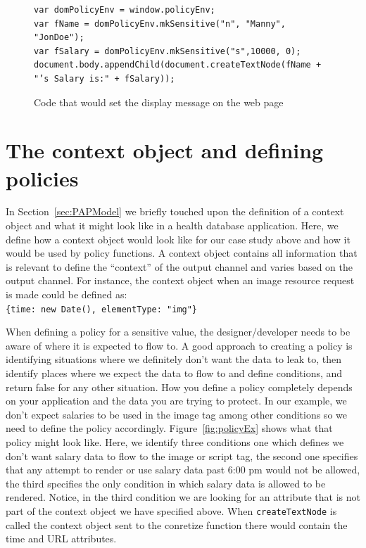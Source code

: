 \begin{figure}
  \begin{lstlisting}
var domPolicyEnv = window.policyEnv;
var fName = domPolicyEnv.mkSensitive("n", "Manny", "JonDoe");
var fSalary = domPolicyEnv.mkSensitive("s",10000, 0);
document.body.appendChild(document.createTextNode(fName + "’s Salary is:" + fSalary));
  \end{lstlisting}
  \caption{Code that would set the display message on the web page}
  \label{fig:displaySalary}
\end{figure}

\section{The context object and defining policies \label{sec:ctxt}}
In Section~\ref{sec:PAPModel} we briefly touched upon the definition of a context
object and what it might look like in a health database application. Here, we define
how a context object would look like for our case study above and how it would be used
by policy functions. A context object contains all information that is relevant
to define the ``context'' of the output channel and varies based on the output
channel. For instance, the context object when an image resource request is made
could be defined as:\\
\indent\texttt{\{time: new Date(), elementType: "img"\}}

\noindent When defining a policy for a sensitive value, the designer/developer needs to be
aware of where it is expected to flow to. A good approach to creating a policy is
identifying situations where we definitely don't want the data to leak to, then
identify places where we expect the data to flow to and define conditions, and return
false for any other situation. How you define a policy completely depends on your
application and the data you are trying to protect. In our example, we don't expect
salaries to be used in the image tag among other conditions so we need to define
the policy accordingly. Figure~\ref{fig:policyEx} shows what that policy might
look like. Here, we identify three conditions one which defines we don't want
salary data to flow to the image or script tag, the second one specifies that any
attempt to render or use salary data past 6:00 pm would not be allowed, the third
specifies the only condition in which salary data is allowed to be rendered.
Notice, in the third condition we are looking for an attribute that is not part
of the context object we have specified above. When \texttt{createTextNode} is called
the context object sent to the conretize function there would contain the time
and URL attributes.

